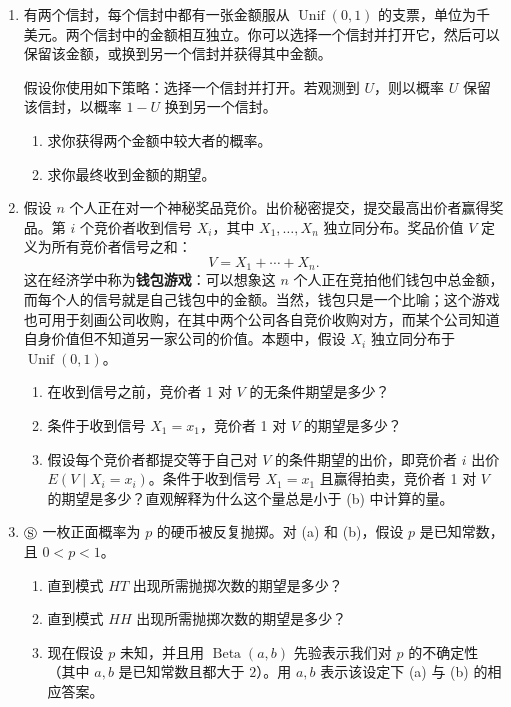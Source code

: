 \documentclass[UTF8,12pt,a4paper,fontset=fandol]{ctexart}
\begin{document}
\begin{enumerate}
  \item 有两个信封，每个信封中都有一张金额服从 $\operatorname{Unif}(0,1)$ 的支票，单位为千美元。两个信封中的金额相互独立。你可以选择一个信封并打开它，然后可以保留该金额，或换到另一个信封并获得其中金额。

  假设你使用如下策略：选择一个信封并打开。若观测到 $U$，则以概率 $U$ 保留该信封，以概率 $1-U$ 换到另一个信封。
  \begin{enumerate}
    \item[(a)] 求你获得两个金额中较大者的概率。
    \item[(b)] 求你最终收到金额的期望。
  \end{enumerate}

  \item 假设 $n$ 个人正在对一个神秘奖品竞价。出价秘密提交，提交最高出价者赢得奖品。第 $i$ 个竞价者收到信号 $X_i$，其中 $X_1,\ldots,X_n$ 独立同分布。奖品价值 $V$ 定义为所有竞价者信号之和：
  \[
    V=X_1+\cdots+X_n.
  \]
  这在经济学中称为\textbf{钱包游戏}：可以想象这 $n$ 个人正在竞拍他们钱包中总金额，而每个人的信号就是自己钱包中的金额。当然，钱包只是一个比喻；这个游戏也可用于刻画公司收购，在其中两个公司各自竞价收购对方，而某个公司知道自身价值但不知道另一家公司的价值。本题中，假设 $X_i$ 独立同分布于 $\operatorname{Unif}(0,1)$。
  \begin{enumerate}
    \item[(a)] 在收到信号之前，竞价者 1 对 $V$ 的无条件期望是多少？
    \item[(b)] 条件于收到信号 $X_1=x_1$，竞价者 1 对 $V$ 的期望是多少？
    \item[(c)] 假设每个竞价者都提交等于自己对 $V$ 的条件期望的出价，即竞价者 $i$ 出价 $E(V\mid X_i=x_i)$。条件于收到信号 $X_1=x_1$ 且赢得拍卖，竞价者 1 对 $V$ 的期望是多少？直观解释为什么这个量总是小于 (b) 中计算的量。
  \end{enumerate}

  \item $\circledS$ 一枚正面概率为 $p$ 的硬币被反复抛掷。对 (a) 和 (b)，假设 $p$ 是已知常数，且 $0<p<1$。
  \begin{enumerate}
    \item[(a)] 直到模式 $HT$ 出现所需抛掷次数的期望是多少？
    \item[(b)] 直到模式 $HH$ 出现所需抛掷次数的期望是多少？
    \item[(c)] 现在假设 $p$ 未知，并且用 $\operatorname{Beta}(a,b)$ 先验表示我们对 $p$ 的不确定性（其中 $a,b$ 是已知常数且都大于 $2$）。用 $a,b$ 表示该设定下 (a) 与 (b) 的相应答案。
  \end{enumerate}


\end{enumerate}
\end{document}
